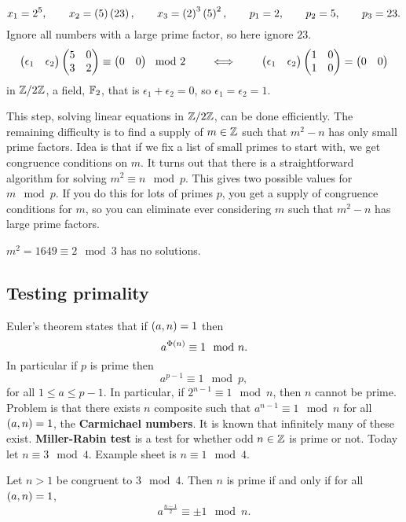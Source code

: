 \begin{example*}
$$ x_1 = 2^5, \qquad x_2 = \left( 5 \right)\left( 23 \right), \qquad x_3 = \left( 2 \right)^3\left( 5 \right)^2, \qquad p_1 = 2, \qquad p_2 = 5, \qquad p_3 = 23. $$
Ignore all numbers with a large prime factor, so here ignore $ 23 $.
$$ \begin{pmatrix} \epsilon_1 & \epsilon_2 \end{pmatrix}\begin{pmatrix} 5 & 0 \\ 3 & 2 \end{pmatrix} \equiv \begin{pmatrix} 0 & 0 \end{pmatrix} \mod 2 \qquad \iff \qquad \begin{pmatrix} \epsilon_1 & \epsilon_2 \end{pmatrix}\begin{pmatrix} 1 & 0 \\ 1 & 0 \end{pmatrix} = \begin{pmatrix} 0 & 0 \end{pmatrix} $$
in $ \mathbb{Z} / 2\mathbb{Z} $, a field, $ \mathbb{F}_2 $, that is $ \epsilon_1 + \epsilon_2 = 0 $, so $ \epsilon_1 = \epsilon_2 = 1 $.
\end{example*}

This step, solving linear equations in $ \mathbb{Z} / 2\mathbb{Z} $, can be done efficiently. The remaining difficulty is to find a supply of $ m \in \mathbb{Z} $ such that $ m^2 - n $ has only small prime factors. Idea is that if we fix a list of small primes to start with, we get congruence conditions on $ m $. It turns out that there is a straightforward algorithm for solving $ m^2 \equiv n \mod p $. This gives two possible values for $ m \mod p $. If you do this for lots of primes $ p $, you get a supply of congruence conditions for $ m $, so you can eliminate ever considering $ m $ such that $ m^2 - n $ has large prime factors.

\begin{example*}
$ m^2 = 1649 \equiv 2 \mod 3 $ has no solutions.
\end{example*}


\subsection{Testing primality}

Euler's theorem states that if $ \left( a, n \right) = 1 $ then
$$ a^{\Phi\left( n \right)} \equiv 1 \mod n. $$
In particular if $ p $ is prime then
$$ a^{p - 1} \equiv 1 \mod p, $$
for all $ 1 \le a \le p - 1 $. In particular, if $ 2^{n - 1} \equiv 1 \mod n $, then $ n $ cannot be prime. Problem is that there exists $ n $ composite such that $ a^{n - 1} \equiv 1 \mod n $ for all $ \left( a, n \right) = 1 $, the \textbf{Carmichael numbers}. It is known that infinitely many of these exist. \textbf{Miller-Rabin test} is a test for whether odd $ n \in \mathbb{Z} $ is prime or not. Today let $ n \equiv 3 \mod 4 $. Example sheet is $ n \equiv 1 \mod 4 $.

\begin{lemma}
\label{lem:30}
Let $ n > 1 $ be congruent to $ 3 \mod 4 $. Then $ n $ is prime if and only if for all $ \left( a, n \right) = 1 $,
$$ a^{\tfrac{n - 1}{2}} \equiv \pm 1 \mod n. $$
\end{lemma}

